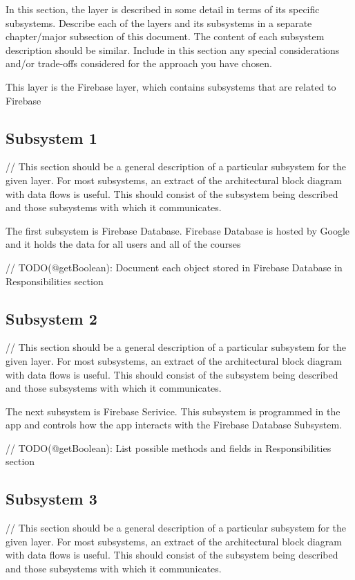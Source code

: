 In this section, the layer is described in some detail in terms of its specific subsystems. Describe each of the layers and its subsystems in a separate chapter/major subsection of this document. The content of each subsystem description should be similar. Include in this section any special considerations and/or trade-offs considered for the approach you have chosen.

This layer is the Firebase layer, which contains subsystems that are related to Firebase

\subsection{Subsystem 1}
// This section should be a general description of a particular subsystem for the given layer. For most subsystems, an extract of the architectural block diagram with data flows is useful. This should consist of the subsystem being described and those subsystems with which it communicates.

The first subsystem is Firebase Database. Firebase Database is hosted by Google and it holds the data for all users and all of the courses

// TODO(@getBoolean): Document each object stored in Firebase Database in Responsibilities section

\subsection{Subsystem 2}
// This section should be a general description of a particular subsystem for the given layer. For most subsystems, an extract of the architectural block diagram with data flows is useful. This should consist of the subsystem being described and those subsystems with which it communicates.

The next subsystem is Firebase Serivice. This subsystem is programmed in the app and controls how the app interacts with the Firebase Database Subsystem.

// TODO(@getBoolean): List possible methods and fields in Responsibilities section

\subsection{Subsystem 3}
// This section should be a general description of a particular subsystem for the given layer. For most subsystems, an extract of the architectural block diagram with data flows is useful. This should consist of the subsystem being described and those subsystems with which it communicates.

